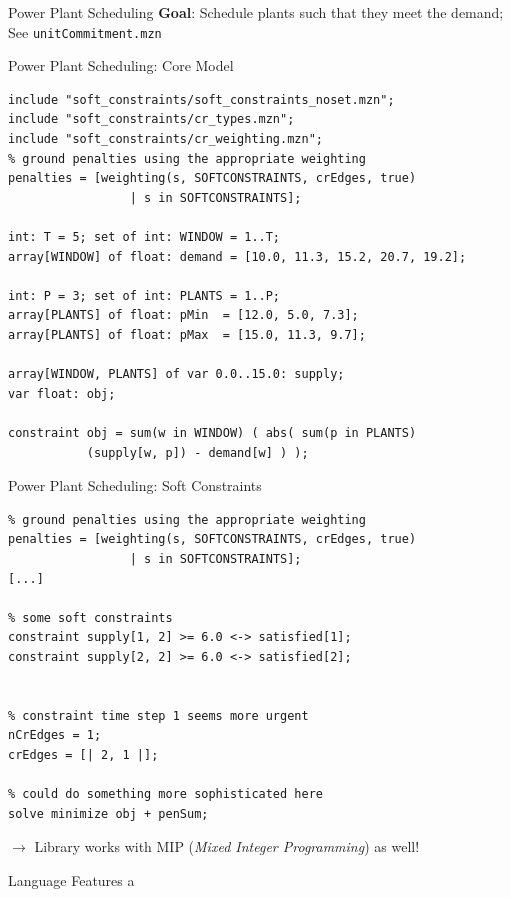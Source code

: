 \documentclass[handout,10pt,xcolor={dvipsnames},fleqn]{beamer}
\begin{document}
\begin{frame}[fragile]{Power Plant Scheduling}
\textbf{Goal}: Schedule plants such that they meet the \alert{demand}; See \texttt{unitCommitment.mzn}


\end{frame}

\begin{frame}[fragile]{Power Plant Scheduling: Core Model}
\begin{lstlisting}
include "soft_constraints/soft_constraints_noset.mzn";
include "soft_constraints/cr_types.mzn";
include "soft_constraints/cr_weighting.mzn";
% ground penalties using the appropriate weighting
penalties = [weighting(s, SOFTCONSTRAINTS, crEdges, true) 
                 | s in SOFTCONSTRAINTS];

int: T = 5; set of int: WINDOW = 1..T;
array[WINDOW] of float: demand = [10.0, 11.3, 15.2, 20.7, 19.2];

int: P = 3; set of int: PLANTS = 1..P;
array[PLANTS] of float: pMin  = [12.0, 5.0, 7.3];
array[PLANTS] of float: pMax  = [15.0, 11.3, 9.7];

array[WINDOW, PLANTS] of var 0.0..15.0: supply; 
var float: obj;

constraint obj = sum(w in WINDOW) ( abs( sum(p in PLANTS) 
           (supply[w, p]) - demand[w] ) );

\end{lstlisting}
\end{frame}

\begin{frame}[fragile]{Power Plant Scheduling: Soft Constraints}
\begin{lstlisting}
% ground penalties using the appropriate weighting
penalties = [weighting(s, SOFTCONSTRAINTS, crEdges, true) 
                 | s in SOFTCONSTRAINTS];
[...]

% some soft constraints
constraint supply[1, 2] >= 6.0 <-> satisfied[1]; 
constraint supply[2, 2] >= 6.0 <-> satisfied[2]; 


% constraint time step 1 seems more urgent
nCrEdges = 1;
crEdges = [| 2, 1 |];

% could do something more sophisticated here
solve minimize obj + penSum;
\end{lstlisting}
$\rightarrow$ Library works with MIP (\emph{Mixed Integer Programming}) as well!
\end{frame}


\begin{frame}{Language Features}
a
\end{frame}
\end{document}
